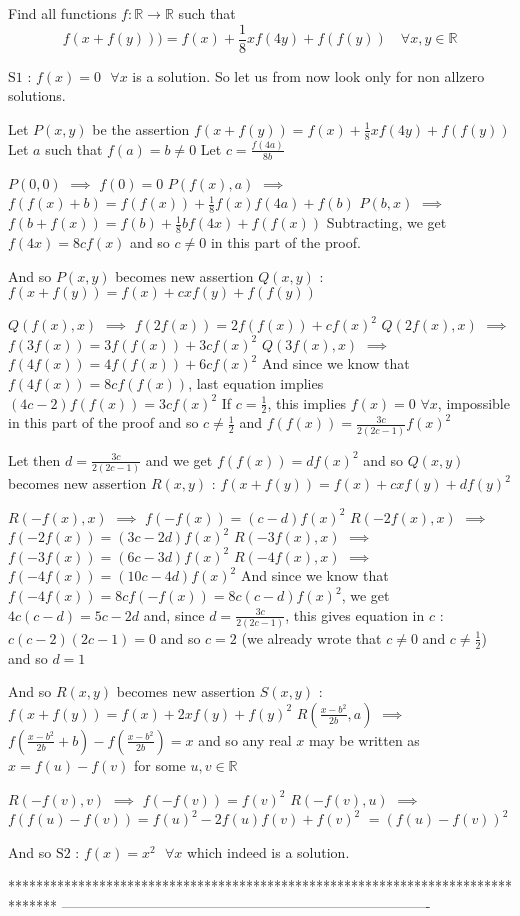 \begin{solution}
	\begin{tcolorbox}Find all functions $f:\mathbb{R}\rightarrow \mathbb{R}$ such that
\[f(x+f(y)))=f(x)+\frac{1}{8}xf(4y)+f(f(y))\quad \forall x,y\in\mathbb{R}\]\end{tcolorbox}
$\boxed{\text{S1 : }f(x)=0\text{  }\forall x}$ is a solution. So let us from now look only for non allzero solutions.

Let $P(x,y)$ be the assertion $f(x+f(y))=f(x)+\frac 18xf(4y)+f(f(y))$
Let $a$ such that $f(a)=b\ne 0$
Let $c=\frac{f(4a)}{8b}$


$P(0,0)$ $\implies$ $f(0)=0$
$P(f(x),a)$ $\implies$ $f(f(x)+b)=f(f(x))+\frac 18f(x)f(4a)+f(b)$
$P(b,x)$ $\implies$ $f(b+f(x))=f(b)+\frac 18bf(4x)+f(f(x))$
Subtracting, we get $f(4x)=8cf(x)$ and so $c\ne 0$ in this part of the proof.

And so $P(x,y)$ becomes new assertion $Q(x,y)$  : $f(x+f(y))=f(x)+cxf(y)+f(f(y))$

$Q(f(x),x)$ $\implies$ $f(2f(x))=2f(f(x))+cf(x)^2$
$Q(2f(x),x)$ $\implies$ $f(3f(x))=3f(f(x))+3cf(x)^2$
$Q(3f(x),x)$ $\implies$ $f(4f(x))=4f(f(x))+6cf(x)^2$
And since we know that $f(4f(x))=8cf(f(x))$, last equation implies $(4c-2)f(f(x))=3cf(x)^2$
If $c=\frac 12$, this implies $f(x)=0$ $\forall x$, impossible in this part of the proof and so $c\ne \frac 12$ and $f(f(x))=\frac{3c}{2(2c-1)}f(x)^2$

Let then $d=\frac{3c}{2(2c-1)}$ and we get $f(f(x))=df(x)^2$ and so 
$Q(x,y)$ becomes new assertion $R(x,y)$ : $f(x+f(y))=f(x)+cxf(y)+df(y)^2$

$R(-f(x),x)$ $\implies$ $f(-f(x))=(c-d)f(x)^2$
$R(-2f(x),x)$ $\implies$ $f(-2f(x))=(3c-2d)f(x)^2$
$R(-3f(x),x)$ $\implies$ $f(-3f(x))=(6c-3d)f(x)^2$
$R(-4f(x),x)$ $\implies$ $f(-4f(x))=(10c-4d)f(x)^2$
And since we know that $f(-4f(x))=8cf(-f(x))=8c(c-d)f(x)^2$, we get $4c(c-d)=5c-2d$ and, since $d=\frac{3c}{2(2c-1)}$, this gives equation in $c$ :
$c(c-2)(2c-1)=0$ and so $c=2$ (we already wrote that $c\ne 0$ and $c\ne \frac 12$) and so $d=1$ 

And so $R(x,y)$ becomes new assertion $S(x,y)$ : $f(x+f(y))=f(x)+2xf(y)+f(y)^2$
$R(\frac{x-b^2}{2b},a)$ $\implies$ $f(\frac{x-b^2}{2b}+b)-f(\frac{x-b^2}{2b})=x$ and so any real $x$ may be written as $x=f(u)-f(v)$ for some $u,v\in\mathbb R$

$R(-f(v),v)$ $\implies$ $f(-f(v))=f(v)^2$
$R(-f(v),u)$ $\implies$ $f(f(u)-f(v))=f(u)^2-2f(u)f(v)+f(v)^2$ $=(f(u)-f(v))^2$

And so $\boxed{\text{S2 : }f(x)=x^2\text{   }\forall x}$ which indeed is a solution.
\end{solution}
*******************************************************************************
-------------------------------------------------------------------------------

